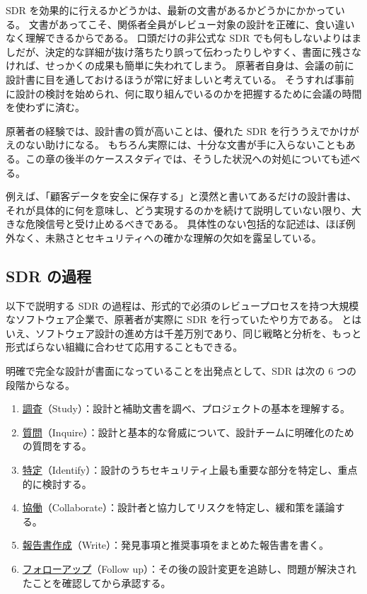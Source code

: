 \documentclass[uplatex]{jsarticle}
\def\label#1{}%
\begin{document}
SDR を効果的に行えるかどうかは、最新の文書があるかどうかにかかっている。
文書があってこそ、関係者全員がレビュー対象の設計を正確に、食い違いなく理解できるからである。
口頭だけの非公式な SDR でも何もしないよりはましだが、決定的な詳細が抜け落ちたり誤って伝わったりしやすく、書面に残さなければ、せっかくの成果も簡単に失われてしまう。
原著者自身は、会議の前に設計書に目を通しておけるほうが常に好ましいと考えている。
そうすれば事前に設計の検討を始められ、何に取り組んでいるのかを把握するために会議の時間を使わずに済む。

原著者の経験では、設計書の質が高いことは、優れた SDR を行ううえでかけがえのない助けになる。
もちろん実際には、十分な文書が手に入らないこともある。この章の後半のケーススタディでは、そうした状況への対処についても述べる。

\begin{exa}[具体性を欠く記述]\label{exa:ch7-store-securely}
例えば、「顧客データを安全に保存する」と漠然と書いてあるだけの設計書は、それが具体的に何を意味し、どう実現するのかを続けて説明していない限り、大きな危険信号と受け止めるべきである。
具体性のない包括的な記述は、ほぼ例外なく、未熟さとセキュリティへの確かな理解の欠如を露呈している。
\end{exa}

\subsection{SDR の過程}

以下で説明する SDR の過程は、形式的で必須のレビュープロセスを持つ大規模なソフトウェア企業で、原著者が実際に SDR を行っていたやり方である。
とはいえ、ソフトウェア設計の進め方は千差万別であり、同じ戦略と分析を、もっと形式ばらない組織に合わせて応用することもできる。

\begin{dfn}\label{dfn:ch7-six-stages}
明確で完全な設計が書面になっていることを出発点として、SDR は次の 6 つの段階からなる。
\begin{enumerate}
\item \underline{調査}（Study）：設計と補助文書を調べ、プロジェクトの基本を理解する。
\item \underline{質問}（Inquire）：設計と基本的な脅威について、設計チームに明確化のための質問をする。
\item \underline{特定}（Identify）：設計のうちセキュリティ上最も重要な部分を特定し、重点的に検討する。
\item \underline{協働}（Collaborate）：設計者と協力してリスクを特定し、緩和策を議論する。
\item \underline{報告書作成}（Write）：発見事項と推奨事項をまとめた報告書を書く。
\item \underline{フォローアップ}（Follow up）：その後の設計変更を追跡し、問題が解決されたことを確認してから承認する。
\end{enumerate}
\end{dfn}
\end{document}
